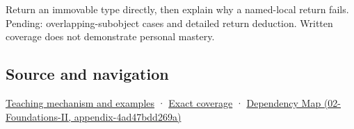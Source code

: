 Return an immovable type directly, then explain why a named-local return fails. Pending: overlapping-subobject cases and detailed return deduction. Written coverage does not demonstrate personal mastery.

\subsection{Source and navigation}\label{source-and-navigation}

\href{Continuous\%20Notes/Computing\%20Foundations\%20-\%20From\%20Bits\%20to\%20C++\%20and\%20Systems\%20APIs\#Return\%20a\%20result\%20without\%20handing\%20out\%20a\%20lifetime\%20problem}{Teaching mechanism and examples} · \hyperref[appendix-fd090d982a15]{Exact coverage} · \href{}{Dependency Map (02-Foundations-II, appendix-4ad47bdd269a)}
